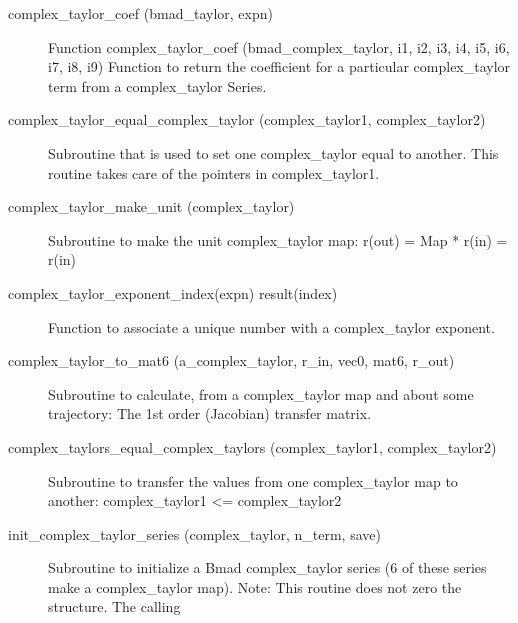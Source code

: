 \begin{description}

\label{r:complex.taylor.coef}
\item[complex_taylor_coef (bmad_taylor, expn)] \Newline 
Function complex_taylor_coef (bmad_complex_taylor, i1, i2, i3, i4, i5, i6, i7, i8, i9)
Function to return the coefficient for a particular complex_taylor term
from a complex_taylor Series.

\label{r:complex.taylor.equal.complex.taylor}
\item[complex_taylor_equal_complex_taylor (complex_taylor1, complex_taylor2)] \Newline 
Subroutine that is used to set one complex_taylor equal to another. 
This routine takes care of the pointers in complex_taylor1. 

\label{r:complex.taylor.make.unit}
\item[complex_taylor_make_unit (complex_taylor)] \Newline 
Subroutine to make the unit complex_taylor map:
      r(out) = Map * r(in) = r(in)

\label{r:complex.taylor.exponent.index}
\item[complex_taylor_exponent_index(expn) result(index)] \Newline 
Function to associate a unique number with a complex_taylor exponent.

\label{r:complex.taylor.to.mat6}
\item[complex_taylor_to_mat6 (a_complex_taylor, r_in, vec0, mat6, r_out)] \Newline 
Subroutine to calculate, from a complex_taylor map and about some trajectory:
  The 1st order (Jacobian) transfer matrix.

\label{r:complex.taylors.equal.complex.taylors}
\item[complex_taylors_equal_complex_taylors (complex_taylor1, complex_taylor2)] \Newline 
Subroutine to transfer the values from one complex_taylor map to another:
    complex_taylor1 <= complex_taylor2

\label{r:init.complex.taylor.series}
\item[init_complex_taylor_series (complex_taylor, n_term, save)] \Newline 
Subroutine to initialize a Bmad complex_taylor series (6 of these series make
a complex_taylor map). Note: This routine does not zero the structure. The calling


\end{description}
